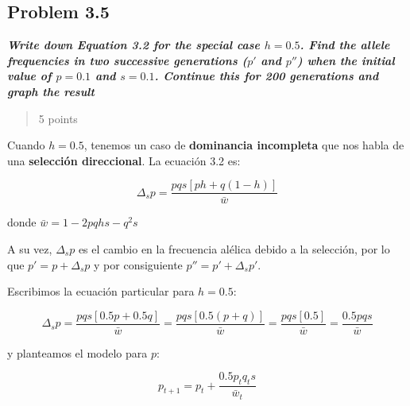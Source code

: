 \documentclass[
  11pt,
]{article}
\begin{document}
\subsection{Problem 3.5}\label{problem-3.5}

\textbf{\emph{Write down Equation 3.2 for the special case \(h = 0.5\).
Find the allele frequencies in two successive generations (\(p'\) and
\(p''\)) when the initial value of \(p = 0.1\) and \(s = 0.1\). Continue
this for 200 generations and graph the result}}

\begin{quote}
5 points
\end{quote}

Cuando \(h = 0.5\), tenemos un caso de \textbf{dominancia incompleta}
que nos habla de una \textbf{selección direccional}. La ecuación 3.2 es:

\[
\Delta_{s}p = \frac{pqs[ph + q(1 -h)]}{\bar{w}}
\]

donde \(\bar{w} = 1 - 2pqhs -q^2s\)

A su vez, \({\Delta}_{s}p\) es el cambio en la frecuencia alélica debido
a la selección, por lo que \(p' = p + {\Delta}_{s}p\) y por consiguiente
\(p'' = p' + {\Delta}_{s}p'\).

Escribimos la ecuación particular para \(h = 0.5\):

\[
\Delta_{s}p = \frac{pqs[0.5p +
0.5q]}{\bar{w}} = \frac{pqs[0.5(p + q)]}{\bar{w}} = \frac{pqs[0.5]}{\bar{w}} = \frac{0.5pqs}{\bar{w}}
\]

y planteamos el modelo para \(p\):

\[
p_{t+1} = p_t + \frac{0.5p_t q_t s}{\bar{w}_t}
\]
\end{document}
